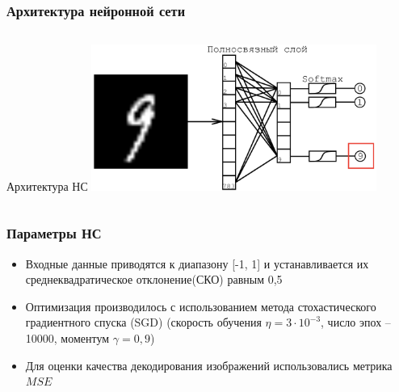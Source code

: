 \begin{frame}
\frametitle{Архитектура нейронной сети}
\begin{columns}[T]
    
    \begin{block}{\centering Архитектура НС}
        \vspace{1mm}
        \centering \includegraphics[width = 0.7\textwidth]{pics/nn.png}
    \end{block}        

    \vspace{-2mm}
        
\end{columns}
\end{frame}
\begin{frame}[t]
    \frametitle{Параметры НС}
    \begin{itemize}
        \item Входные данные приводятся к диапазону [-1, 1] и устанавливается их
        среднеквадратическое отклонение(СКО) равным 0,5
        \item Оптимизация производилось с использованием метода стохастического градиентного спуска (SGD)
        (скорость обучения $\eta =3 \cdot 10^{-3}$, число эпох -- 10000, моментум $\gamma = 0,9$)
        \item Для оценки качества декодирования изображений использовались 
        метрика $MSE$
    \end{itemize}
    
    \end{frame}
    